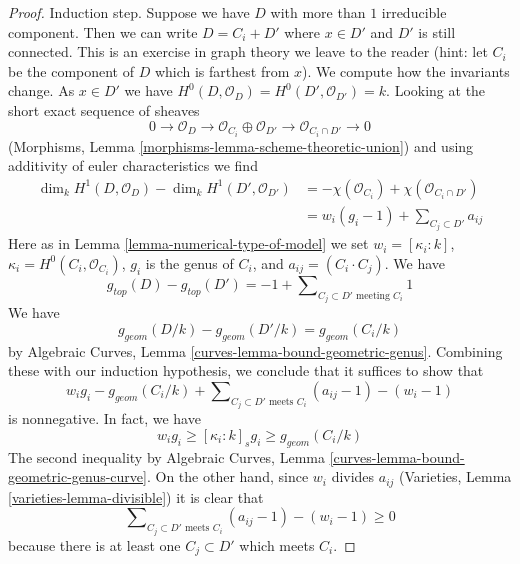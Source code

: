 \documentclass[10pt,a4paper]{amsart}
\theoremstyle{plain}
\theoremstyle{definition}
\theoremstyle{remark}
\numberwithin{equation}{subsection}
\begin{document}
\begin{proof}
\medskip\noindent
Induction step. Suppose we have $D$ with more than $1$ irreducible
component. Then we can write $D = C_i + D'$ where $x \in D'$ and
$D'$ is still connected. This is an exercise in graph theory we leave
to the reader (hint: let $C_i$ be the component of $D$ which is
farthest from $x$). We compute how the invariants change.
As $x \in D'$ we have $H^0(D, \mathcal{O}_D) = H^0(D', \mathcal{O}_{D'}) = k$.
Looking at the short exact sequence of sheaves
$$
0 \to \mathcal{O}_D \to \mathcal{O}_{C_i} \oplus \mathcal{O}_{D'}
\to \mathcal{O}_{C_i \cap D'} \to 0
$$
(Morphisms, Lemma \ref{morphisms-lemma-scheme-theoretic-union})
and using additivity of euler characteristics we find
\begin{align*}
\dim_k H^1(D, \mathcal{O}_D) - \dim_k H^1(D', \mathcal{O}_{D'})
& =
-\chi(\mathcal{O}_{C_i}) + \chi(\mathcal{O}_{C_i \cap D'}) \\
& =
w_i(g_i - 1) + \sum\nolimits_{C_j \subset D'} a_{ij}
\end{align*}
Here as in Lemma \ref{lemma-numerical-type-of-model} we set
$w_i = [\kappa_i : k]$, $\kappa_i = H^0(C_i, \mathcal{O}_{C_i})$,
$g_i$ is the genus of $C_i$, and $a_{ij} = (C_i \cdot C_j)$.
We have
$$
g_{top}(D) - g_{top}(D') = -1 +
\sum\nolimits_{C_j \subset D'\text{ meeting }C_i} 1
$$
We have
$$
g_{geom}(D/k) - g_{geom}(D'/k) = g_{geom}(C_i/k)
$$
by Algebraic Curves, Lemma \ref{curves-lemma-bound-geometric-genus}.
Combining these with our induction hypothesis, we
conclude that it suffices to show that
$$
w_i g_i - g_{geom}(C_i/k) +
\sum\nolimits_{C_j \subset D'\text{ meets } C_i} (a_{ij} - 1) - (w_i - 1)
$$
is nonnegative. In fact, we have
\begin{equation}
\label{equation-genus-change}
w_i g_i \geq [\kappa_i : k]_s g_i \geq g_{geom}(C_i/k)
\end{equation}
The second inequality by
Algebraic Curves, Lemma \ref{curves-lemma-bound-geometric-genus-curve}.
On the other hand, since $w_i$ divides $a_{ij}$
(Varieties, Lemma \ref{varieties-lemma-divisible})
it is clear that
\begin{equation}
\label{equation-change-intersections}
\sum\nolimits_{C_j \subset D'\text{ meets } C_i} (a_{ij} - 1) - (w_i - 1)
\geq 0
\end{equation}
because there is at least one $C_j \subset D'$ which meets $C_i$.
\end{proof}
\end{document}
